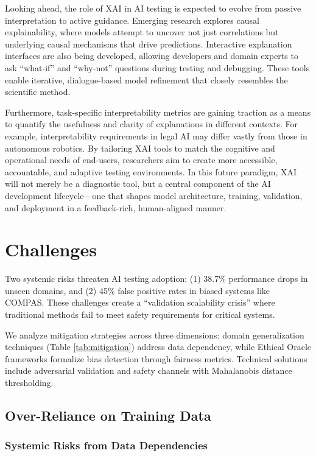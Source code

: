 \documentclass[manuscript,screen,review]{acmart}
\begin{document}
Looking ahead, the role of XAI in AI testing is expected to evolve from passive interpretation to active guidance. Emerging research explores causal explainability, where models attempt to uncover not just correlations but underlying causal mechanisms that drive predictions. Interactive explanation interfaces are also being developed, allowing developers and domain experts to ask ``what-if'' and ``why-not'' questions during testing and debugging. These tools enable iterative, dialogue-based model refinement that closely resembles the scientific method.

Furthermore, task-specific interpretability metrics are gaining traction as a means to quantify the usefulness and clarity of explanations in different contexts. For example, interpretability requirements in legal AI may differ vastly from those in autonomous robotics. By tailoring XAI tools to match the cognitive and operational needs of end-users, researchers aim to create more accessible, accountable, and adaptive testing environments. In this future paradigm, XAI will not merely be a diagnostic tool, but a central component of the AI development lifecycle---one that shapes model architecture, training, validation, and deployment in a feedback-rich, human-aligned manner.

\section{Challenges}

Two systemic risks threaten AI testing adoption: (1) 38.7\% performance drops in unseen domains, and (2) 45\% false positive rates in biased systems like COMPAS. These challenges create a ``validation scalability crisis'' where traditional methods fail to meet safety requirements for critical systems.

We analyze mitigation strategies across three dimensions: domain generalization techniques (Table \ref{tab:mitigation}) address data dependency, while Ethical Oracle frameworks formalize bias detection through fairness metrics. Technical solutions include adversarial validation and safety channels with Mahalanobis distance thresholding.

\subsection{Over-Reliance on Training Data}

\subsubsection{Systemic Risks from Data Dependencies}
\end{document}
